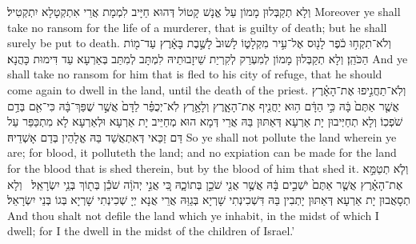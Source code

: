 {וְלָא תְקַבְּלוּן מָמוֹן עַל אֱנָשׁ קָטוֹל דְּהוּא חַיָּיב לִמְמָת אֲרֵי אִתְקְטָלָא יִתְקְטִיל׃}
{Moreover ye shall take no ransom for the life of a murderer, that is guilty of death; but he shall surely be put to death.}{}
{וְלֹא־תִקְח֣וּ כֹ֔פֶר לָנ֖וּס אֶל־עִ֣יר מִקְלָט֑וֹ לָשׁוּב֙ לָשֶׁ֣בֶת בָּאָ֔רֶץ עַד־מ֖וֹת הַכֹּהֵֽן׃
}
{וְלָא תְקַבְּלוּן מָמוֹן לְמִעְרַק לְקִרְיַת שֵׁיזָבוּתֵיהּ לִמְתָּב לְמִתַּב בְּאַרְעָא עַד דִּימוּת כָּהֲנָא׃}
{And ye shall take no ransom for him that is fled to his city of refuge, that he should come again to dwell in the land, until the death of the priest.}{}
{וְלֹֽא־תַחֲנִ֣יפוּ אֶת־הָאָ֗רֶץ אֲשֶׁ֤ר אַתֶּם֙ בָּ֔הּ כִּ֣י הַדָּ֔ם ה֥וּא יַחֲנִ֖יף אֶת־הָאָ֑רֶץ וְלָאָ֣רֶץ לֹֽא־יְכֻפַּ֗ר לַדָּם֙ אֲשֶׁ֣ר שֻׁפַּךְ־בָּ֔הּ כִּי־אִ֖ם בְּדַ֥ם שֹׁפְכֽוֹ׃
}
{וְלָא תְחַיְּיבוּן יָת אַרְעָא דְּאַתּוּן בַּהּ אֲרֵי דְּמָא הוּא מְחַיֵּיב יָת אַרְעָא וּלְאַרְעָא לָא מִתְכַּפַּר עַל דַּם זַכַּאי דְּאִתְאֲשַׁד בַּהּ אֱלָהֵין בְּדַם אָשְׁדֵיהּ׃}
{So ye shall not pollute the land wherein ye are; for blood, it polluteth the land; and no expiation can be made for the land for the blood that is shed therein, but by the blood of him that shed it.}{}
{וְלֹ֧א תְטַמֵּ֣א אֶת־הָאָ֗רֶץ אֲשֶׁ֤ר אַתֶּם֙ יֹשְׁבִ֣ים בָּ֔הּ אֲשֶׁ֥ר אֲנִ֖י שֹׁכֵ֣ן בְּתוֹכָ֑הּ כִּ֚י אֲנִ֣י יְהֹוָ֔ה שֹׁכֵ֕ן בְּת֖וֹךְ בְּנֵ֥י יִשְׂרָאֵֽל׃ \petucha 
{}}
{וְלָא תְסָאֲבוּן יָת אַרְעָא דְּאַתּוּן יָתְבִין בַּהּ דִּשְׁכִינְתִי שָׁרְיָא בְּגַוַּהּ אֲרֵי אֲנָא יְיָ שְׁכִינְתִי שָׁרְיָא בְּגוֹ בְּנֵי יִשְׂרָאֵל׃}
{And thou shalt not defile the land which ye inhabit, in the midst of which I dwell; for I the \lord\space dwell in the midst of the children of Israel.’}{}
\newperek
{}%
